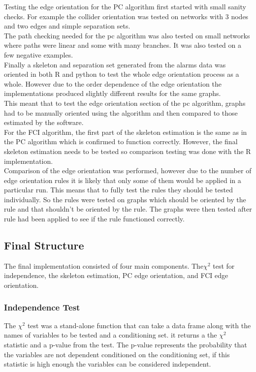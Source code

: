 \documentclass{article}
\begin{document}
Testing the edge orientation for the PC algorithm first started with small sanity checks. For example the collider orientation was tested on networks with 3 nodes and two edges and simple separation sets.\\

The path checking needed for the pc algorithm was also  tested on small networks where paths were linear and some with many branches. It was also tested on a few negative examples.\\

Finally a skeleton and separation set generated from the alarms data was oriented in both R and python to test the whole edge orientation process as a whole. However due to the order dependence of the edge orientation the implementations produced slightly different results for the same graphs.\\

This meant that to test the edge orientation section of the pc algorithm, graphs had to be manually oriented using the algorithm and then compared to those estimated by the software.\\

For the FCI algorithm, the first part of the skeleton estimation is the same as in the PC algorithm  which is confirmed to function correctly. However, the final skeleton estimation needs to be tested so comparison testing was done with the R implementation.\\

Comparison of the edge orientation was performed, however due to the number of edge orientation rules it is likely that only some of them would be applied in a particular run. This means that to fully test  the rules they should be tested individually. So the rules were tested on graphs which should be oriented by the rule and that shouldn't be oriented by the rule. The graphs were then tested after rule had been applied to see if the rule functioned correctly.\\ 


\subsection{Final Structure}
The final implementation consisted of four main components. The$\chi^2$ test for independence, the skeleton estimation, PC edge orientation, and FCI edge orientation.\\

\subsubsection{Independence Test}
The $\chi^2$ test was a stand-alone function that can take a data frame along with the names of variables to be tested and a conditioning set. it returns a the $\chi^2$ statistic and a p-value from the test. The p-value represents the probability that the variables are not dependent conditioned on the conditioning set, if this statistic is high enough the variables can be considered independent.
\end{document}

